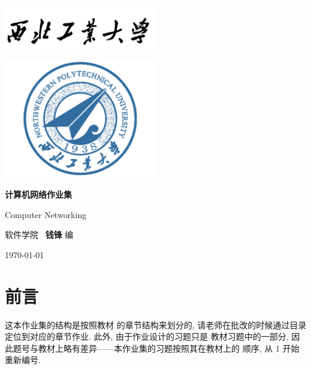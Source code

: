 \documentclass[10pt,UTF8]{ctexbook} %
\begin{document}
\theoremstyle{my3theoremstyle} \newtheorem*{remark}{注}

\begin{titlepage}
    \thispagestyle{empty}
    \centering
        \vspace*{2cm}
        \includegraphics[width=0.5\textwidth]{pic/npu_2.png}\par
        \vspace{1cm}
        \includegraphics[width=0.5\textwidth]{pic/npu_1.png}\par
    \vspace{1cm}
        \begin{center}
            \Huge \heiti \textbf{计算机网络作业集}

            Computer Networking
        \end{center}
        \vspace{5cm}
        \begin{center}
        \songti
        \kaishu 软件学院 \, \heiti\textbf{钱锋} \quad \songti 编
        \vspace{0.5cm}

    \today
    \end{center}
\end{titlepage}

\frontmatter
\newpage
\pagestyle{plain}
\makeatother

% 
\chapter{前言}
\thispagestyle{empty}

\quad\quad 这本作业集的结构是按照教材 \cite{自顶向下} 的章节结构来划分的,
请老师在批改的时候通过目录定位到对应的章节作业. 此外, 由于作业设计的习题只是
教材习题中的一部分, 因此题号与教材上略有差异——本作业集的习题按照其在教材上的
顺序, 从 1 开始重新编号.
\end{document}

